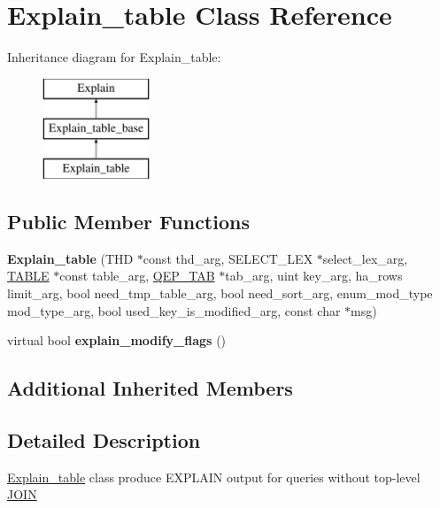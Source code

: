 \hypertarget{classExplain__table}{}\section{Explain\+\_\+table Class Reference}
\label{classExplain__table}
Inheritance diagram for Explain\+\_\+table\+:\begin{figure}[H]
\begin{center}
\leavevmode
\includegraphics[height=3.000000cm]{classExplain__table}
\end{center}
\end{figure}
\subsection*{Public Member Functions}
\begin{DoxyCompactItemize}
\item 
\mbox{\label{classExplain__table_a6b96e493d12172cd606275538dd6bd2a}} 
{\bfseries Explain\+\_\+table} (T\+HD $\ast$const thd\+\_\+arg, S\+E\+L\+E\+C\+T\+\_\+\+L\+EX $\ast$select\+\_\+lex\+\_\+arg, \mbox{\hyperlink{structTABLE}{T\+A\+B\+LE}} $\ast$const table\+\_\+arg, \mbox{\hyperlink{classQEP__TAB}{Q\+E\+P\+\_\+\+T\+AB}} $\ast$tab\+\_\+arg, uint key\+\_\+arg, ha\+\_\+rows limit\+\_\+arg, bool need\+\_\+tmp\+\_\+table\+\_\+arg, bool need\+\_\+sort\+\_\+arg, enum\+\_\+mod\+\_\+type mod\+\_\+type\+\_\+arg, bool used\+\_\+key\+\_\+is\+\_\+modified\+\_\+arg, const char $\ast$msg)
\item 
\mbox{\label{classExplain__table_a588e2f2f6b9ee3a2fcfd90247a15ce2d}} 
virtual bool {\bfseries explain\+\_\+modify\+\_\+flags} ()
\end{DoxyCompactItemize}
\subsection*{Additional Inherited Members}


\subsection{Detailed Description}
\mbox{\hyperlink{classExplain__table}{Explain\+\_\+table}} class produce E\+X\+P\+L\+A\+IN output for queries without top-\/level \mbox{\hyperlink{classJOIN}{J\+O\+IN}}

